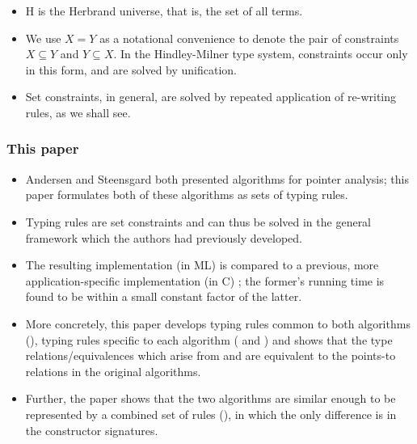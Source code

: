 \documentclass{beamer}
\begin{document}
\begin{frame}[allowframebreaks]
  \begin{itemize}
    \item H is the Herbrand universe, that is, the set of all terms.
    \item We use $ X = Y $ as a notational convenience to denote the
      pair of constraints $ X \subseteq Y $ and $ Y \subseteq X
      $. In the Hindley-Milner type system, constraints occur only in
      this form, and are solved by unification.
    \item Set constraints, in general, are solved by repeated
      application of re-writing rules, as we shall see.
  \end{itemize}
\end{frame}

\begin{frame}[allowframebreaks]
  \frametitle{This paper}

  \begin{itemize}
  \item Andersen \cite{Andersen94programanalysis} and Steensgard
    \cite{Steensgaard96points-toanalysis} both presented algorithms
    for pointer analysis; this paper formulates both of
    these algorithms as sets of typing rules. 
  \item Typing rules are set constraints and can thus be solved in the
    general framework \cite{F?hndrich97programanalysis} which the
    authors had previously developed.
  \item The resulting implementation (in ML) is compared to a previous,
    more application-specific implementation (in C)
    \cite{Shapiro97fastand}; the former's running time is found to be
    within a small constant factor of the latter.
  \item More concretely, this paper develops typing rules common to
    both algorithms (), typing rules specific to each
    algorithm ( and ) and shows that the
    type relations/equivalences which arise from
     and  are
    equivalent to the points-to relations in the original algorithms.
  \item Further, the paper shows that the two algorithms are similar
    enough to be represented by a combined set of rules
    (), in which the only difference is in the
    constructor signatures.
  \end{itemize}
\end{frame}
\end{document}
